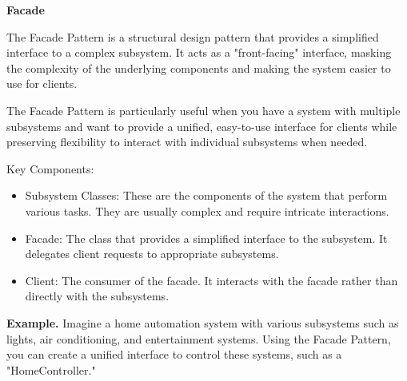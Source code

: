 \medskip
\begin{center}
\textbf{Facade}
\end{center}

The Facade Pattern is a structural design pattern that provides a simplified interface to a complex subsystem. It acts as a "front-facing" interface, masking the complexity of the underlying components and making the system easier to use for clients.

The Facade Pattern is particularly useful when you have a system with multiple subsystems and want to provide a unified, easy-to-use interface for clients while preserving flexibility to interact with individual subsystems when needed.

Key Components:

\begin{itemize}
\item Subsystem Classes: These are the components of the system that perform various tasks. They are usually complex and require intricate interactions.

\item Facade: The class that provides a simplified interface to the subsystem. It delegates client requests to appropriate subsystems.

\item Client: The consumer of the facade. It interacts with the facade rather than directly with the subsystems.
\end{itemize}

\textbf{Example.} Imagine a home automation system with various subsystems such as lights, air conditioning, and entertainment systems. Using the Facade Pattern, you can create a unified interface to control these systems, such as a "HomeController."

